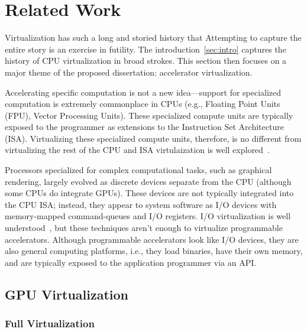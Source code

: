 \chapter{Related Work}
\label{sec:related}

Virtualization has such a long and storied history that Attempting to capture
the entire story is an exercise in futility. The introduction~\ref{sec:intro}
captures the history of CPU virtualization in broad strokes. This section then
focuses on a major theme of the proposed dissertation:
accelerator virtualization.

Accelerating specific computation is not a new idea---support for specialized
computation is extremely commonplace in CPUs (e.g., Floating Point Units
(FPU), Vector Processing Units). These specialized compute units are
typically exposed to the programmer as extensions to the Instruction Set
Architecture (ISA). Virtualizing these specialized compute units, therefore,
is no different from virtualizing the rest of the CPU and ISA virtulaization
is well explored~\cite{cp40,vm370,popek-goldberg,bugnion-disco,
bugnion-nieh-tsafrir,bugnion-workstation}.

Processors specialized for complex computational tasks, such as graphical
rendering, largely evolved as discrete devices separate from the CPU (although
some CPUs do integrate GPUs). These devices are not typically integrated into
the CPU ISA; instead, they appear to system software as I/O devices with
memory-mapped command-queues and I/O registers. I/O virtualization is well
understood~\cite{waldspurger12cacm,paradice,Kuperman_undated-io,Sig2010-ml,
zeng2013improved,abramson2006intel}, but these techniques aren't enough to
virtualize programmable accelerators. Although programmable accelerators look
like I/O devices, they are also general computing platforms, i.e., they load
binaries, have their own memory, and are typically exposed to the application
programmer via an API.

\section{GPU Virtualization}



\subsection{Full Virtualization}

